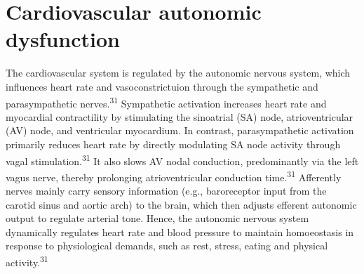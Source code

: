 \documentclass[
  a4paper,
  headsepline=true,
  open=left]{scrbook}
\begin{document}
\hypertarget{cardiovascular-autonomic-dysfunction}{%
\section{Cardiovascular autonomic
dysfunction}\label{cardiovascular-autonomic-dysfunction}}

The cardiovascular system is regulated by the autonomic nervous system,
which influences heart rate and vasoconstrictuion through the
sympathetic and parasympathetic nerves.\textsuperscript{31} Sympathetic
activation increases heart rate and myocardial contractility by
stimulating the sinoatrial (SA) node, atrioventricular (AV) node, and
ventricular myocardium. In contrast, parasympathetic activation
primarily reduces heart rate by directly modulating SA node activity
through vagal stimulation.\textsuperscript{31} It also slows AV nodal
conduction, predominantly via the left vagus nerve, thereby prolonging
atrioventricular conduction time.\textsuperscript{31} Afferently nerves
mainly carry sensory information (e.g., baroreceptor input from the
carotid sinus and aortic arch) to the brain, which then adjusts efferent
autonomic output to regulate arterial tone. Hence, the autonomic nervous
system dynamically regulates heart rate and blood pressure to maintain
homoeostasis in response to physiological demands, such as rest, stress,
eating and physical activity.\textsuperscript{31}
\end{document}
